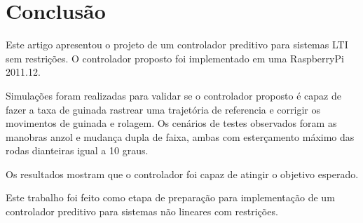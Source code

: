\section{ Conclusão }
\label{sec:conc}

Este artigo apresentou o projeto de um controlador preditivo para 
sistemas LTI sem restrições. O controlador proposto foi implementado em uma
RaspberryPi 2011.12.

Simulações foram realizadas para validar se o controlador proposto é capaz de
fazer a taxa de guinada rastrear uma trajetória de referencia e corrigir os
movimentos de guinada e rolagem. Os cenários de testes observados foram 
as manobras anzol e mudança dupla de faixa, ambas com esterçamento máximo
das rodas dianteiras igual a 10 graus.

Os resultados mostram que o controlador foi capaz de atingir o objetivo
esperado.

Este trabalho foi feito como etapa de preparação para implementação de um
controlador preditivo para sistemas não lineares com restrições.